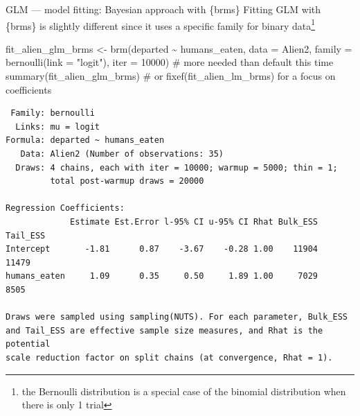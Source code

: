 \documentclass[
  10pt,
  ignorenonframetext,
  aspectratio=169,
  t]{beamer}
\newenvironment{Shaded}{\begin{snugshade}}{\end{snugshade}}
\newcommand{\AttributeTok}[1]{\textcolor[rgb]{0.40,0.45,0.13}{#1}}
\newcommand{\CommentTok}[1]{\textcolor[rgb]{0.37,0.37,0.37}{#1}}
\newcommand{\DecValTok}[1]{\textcolor[rgb]{0.68,0.00,0.00}{#1}}
\newcommand{\FunctionTok}[1]{\textcolor[rgb]{0.28,0.35,0.67}{#1}}
\newcommand{\NormalTok}[1]{\textcolor[rgb]{0.00,0.23,0.31}{#1}}
\newcommand{\OtherTok}[1]{\textcolor[rgb]{0.00,0.23,0.31}{#1}}
\newcommand{\SpecialCharTok}[1]{\textcolor[rgb]{0.37,0.37,0.37}{#1}}
\newcommand{\StringTok}[1]{\textcolor[rgb]{0.13,0.47,0.30}{#1}}
\begin{document}
\begin{frame}[fragile]{GLM --- model fitting: Bayesian approach with
\{brms\}}
\protect{}\label{glm-model-fitting-bayesian-approach-with-brms}
Fitting GLM with \{brms\} is slightly different since it uses a specific
family for binary
data\footnote{the Bernoulli distribution is a special case of the binomial distribution when there is only 1 trial}

\footnotesize

\begin{Shaded}
\begin{Highlighting}[]
\NormalTok{fit\_alien\_glm\_brms }\OtherTok{\textless{}{-}} \FunctionTok{brm}\NormalTok{(departed }\SpecialCharTok{\textasciitilde{}}\NormalTok{ humans\_eaten, }\AttributeTok{data =}\NormalTok{ Alien2,}
                          \AttributeTok{family =} \FunctionTok{bernoulli}\NormalTok{(}\AttributeTok{link =} \StringTok{"logit"}\NormalTok{),}
                          \AttributeTok{iter =} \DecValTok{10000}\NormalTok{) }\CommentTok{\# more needed than default this time}
\FunctionTok{summary}\NormalTok{(fit\_alien\_glm\_brms) }\CommentTok{\# or fixef(fit\_alien\_lm\_brms) for a focus on coefficients}
\end{Highlighting}
\end{Shaded}

\normalsize

\scriptsize

\begin{verbatim}
 Family: bernoulli 
  Links: mu = logit 
Formula: departed ~ humans_eaten 
   Data: Alien2 (Number of observations: 35) 
  Draws: 4 chains, each with iter = 10000; warmup = 5000; thin = 1;
         total post-warmup draws = 20000

Regression Coefficients:
             Estimate Est.Error l-95% CI u-95% CI Rhat Bulk_ESS Tail_ESS
Intercept       -1.81      0.87    -3.67    -0.28 1.00    11904    11479
humans_eaten     1.09      0.35     0.50     1.89 1.00     7029     8505

Draws were sampled using sampling(NUTS). For each parameter, Bulk_ESS
and Tail_ESS are effective sample size measures, and Rhat is the potential
scale reduction factor on split chains (at convergence, Rhat = 1).
\end{verbatim}

\normalsize
\end{frame}
\end{document}

